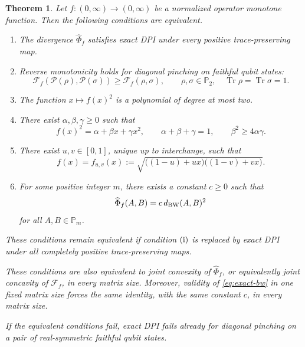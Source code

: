 \documentclass[11pt]{amsart}
\newtheorem{theorem}{Theorem}[section]
\theoremstyle{definition}
\theoremstyle{remark}
\newcommand{\Tr}{\operatorname{Tr}}
\newcommand{\altPhi}{\widehat{\Phi}}
\begin{document}
\begin{theorem}
	\label{thm:quadratic-square-classification}
	Let $f:(0,\infty)\to(0,\infty)$ be a normalized operator monotone
	function.  Then the following conditions are equivalent.
	\begin{enumerate}
	\item[\rm(i)] The divergence $\altPhi_f$ satisfies exact DPI under every
	positive trace-preserving map.
		
		\item[\rm(ii)] Reverse monotonicity holds for diagonal pinching on
		faithful qubit states:
		\[
		\mathcal F_f(\mathcal P(\rho),\mathcal P(\sigma))
		\ge \mathcal F_f(\rho,\sigma),
		\qquad
		\rho,\sigma\in\mathbb P_2,
		\quad
		\Tr\rho=\Tr\sigma=1.
		\]
		
		\item[\rm(iii)] The function $x\mapsto f(x)^2$ is a polynomial
		of degree at most two.
		
		\item[\rm(iv)] There exist $\alpha,\beta,\gamma\ge0$ such that
		\[
		f(x)^2=\alpha+\beta x+\gamma x^2,
		\qquad
		\alpha+\beta+\gamma=1,
		\qquad
		\beta^2\ge4\alpha\gamma.
		\]
		
		\item[\rm(v)] There exist $u,v\in[0,1]$, unique up to
		interchange, such that
		\begin{equation}\label{eq:fuv}
			f(x)=f_{u,v}(x)
			:=\sqrt{\bigl((1-u)+ux\bigr)
				\bigl((1-v)+vx\bigr)}.
		\end{equation}
		
		\item[\rm(vi)] For some positive integer $m$, there exists a
		constant $c\ge0$ such that
		\begin{equation}\label{eq:exact-bw}
			\altPhi_f(A,B)=c\,d_{\rm BW}(A,B)^2
		\end{equation}
		for all $A,B\in\mathbb P_m$.
	\end{enumerate}
These conditions remain equivalent if condition ${\rm(i)}$ is replaced
by exact DPI under all completely positive trace-preserving maps.
	
	These conditions are also equivalent to joint convexity of
	$\altPhi_f$, or equivalently joint concavity of $\mathcal F_f$,
	in every matrix size.  Moreover, validity of \eqref{eq:exact-bw}
	in one fixed matrix size forces the same identity, with the same
	constant $c$, in every matrix size.
	
	If the equivalent conditions fail, exact DPI fails already for
	diagonal pinching on a pair of real-symmetric faithful qubit states.
\end{theorem}
\end{document}
